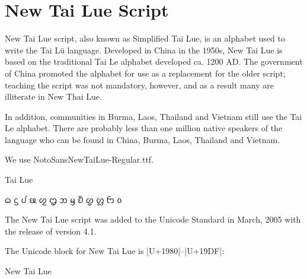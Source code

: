 \section{New Tai Lue Script}
\label{s:newtailue}


New Tai Lue script, also known as Simplified Tai Lue, is an alphabet used to write the Tai Lü language. Developed in China in the 1950s, New Tai Lue is based on the traditional Tai Le alphabet developed ca. 1200 AD. The government of China promoted the alphabet for use as a replacement for the older script; teaching the script was not mandatory, however, and as a result many are illiterate in New Thai Lue. 

In addition, communities in Burma, Laos, Thailand and Vietnam still use the Tai Le alphabet. There are probably less than one million native speakers of the language who can be found in China, Burma, Laos, Thailand and Vietnam.

We use NotoSansNewTaiLue-Regular.ttf.

\begin{scriptexample}[]{Tai Lue}
{\centering\tailue \LARGE

ᦒ	ᦓ	ᦔ	ᦕ	ᦖ	ᦗ	ᦘ	ᦙ	ᦚ	ᦛ	ᦜ	ᦝ	ᦞ	

}
\end{scriptexample}

The New Tai Lue script was added to the Unicode Standard in March, 2005 with the release of version 4.1.

The Unicode block for New Tai Lue is |U+1980|–|U+19DF|:

\begin{scriptexample}[]{New Tai Lue}
\end{scriptexample}